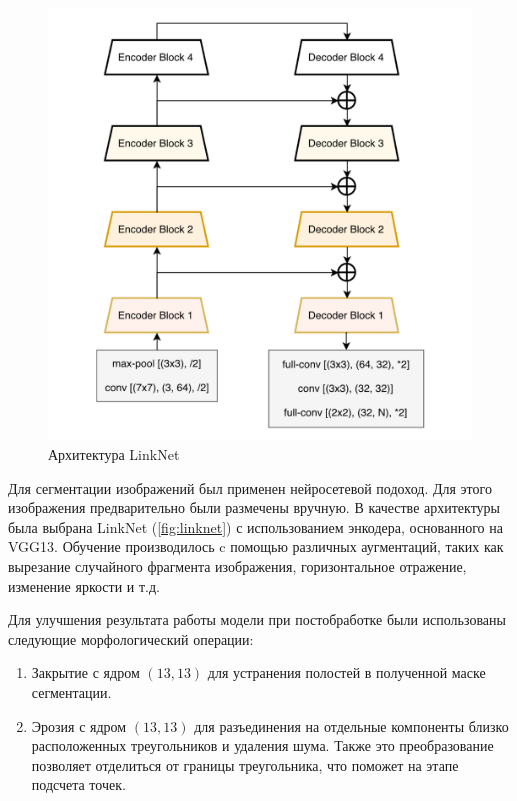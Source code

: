 \documentclass[11pt]{extarticle}
\begin{document}
\begin{figure}
  \centering
  \includegraphics[width=\textwidth]{LinkNet}
  \caption{Архитектура LinkNet}
  \label{fig:linknet}
\end{figure}

Для сегментации изображений был применен нейросетевой подоход. Для этого изображения предварительно были размечены вручную. В качестве архитектуры была выбрана LinkNet (\autoref{fig:linknet}) с использованием энкодера, основанного на VGG13. Обучение производилось c помощью различных аугментаций, таких как вырезание случайного фрагмента изображения, горизонтальное отражение, изменение яркости и т.д. 

Для улучшения результата работы модели при постобработке были использованы следующие морфологический операции:
\begin{enumerate}
  \item Закрытие с ядром $(13, 13)$ для устранения полостей в полученной маске сегментации.
  \item Эрозия с ядром $(13, 13)$ для разъединения на отдельные компоненты близко расположенных треугольников и удаления шума. Также это преобразование позволяет отделиться от границы треугольника, что поможет на этапе подсчета точек.
\end{enumerate}
\end{document}
